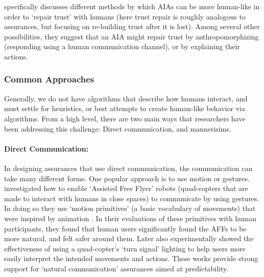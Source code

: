 \citet{De_Visser2018-kd} specifically discusses different methods by which AIAs can be more human-like in order to `repair trust' with humans (here trust repair is roughly analogous to assurances, but focusing on re-building trust after it is lost). Among several other possibilities, they suggest that an AIA might repair trust by anthropomorphizing (responding using a human communication channel), or by explaining their actions. 

\subsubsection{Common Approaches}
Generally, we do not have algorithms that describe how humans interact, and must settle for heuristics, or best attempts to create human-like behavior via algorithms. From a high level, there are two main ways that researchers have been addressing this challenge: Direct communication, and mannerisims.

\paragraph{Direct Communication:} 
In designing assurances that use direct communication, the communication can take many different forms. One popular approach is to use motion or gestures.\citet{Szafir2014-ok} investigated how to enable `Assisted Free Flyer' robots (quad-copters that are made to interact with humans in close spaces) to communicate by using gestures. In doing so they use `motion primitives' (a basic vocabulary of movements) that were inspired by animation \cite{Van_Breemen2004-rz}. In their evaluations of these primitives with human participants, they found that human users significantly found the AFFs to be more natural, and felt safer around them. Later \citet{Szafir2015-iy} also experimentally showed the effectiveness of using a quad-copter's `turn signal' lighting to help users more easily interpret the intended movements and actions. These works provide strong support for `natural communication' assurances aimed at predictability.

